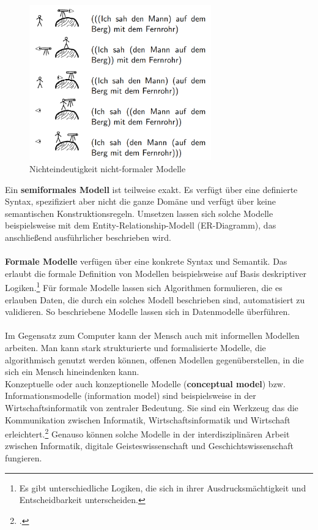 \documentclass[12pt,a4paper]{article}
\begin{document}
\begin{figure}[H]
\centering
	\includegraphics[width=0.7\textwidth]{img/fernrohr.png}  
    \caption[Nichteindeutigkeit nicht-formaler Modelle, KÖNIG Bettina: Vorlesung ''Modellierungsmethoden der Informatik'', \protect\url{ti.inf.uni-due.de/fileadmin/public/teaching/mod/slides/ws201112/einfuehrung.pdf}, 10.06.2019]{Nichteindeutigkeit nicht-formaler Modelle}\label{fig:fernrohr}
\end{figure} 
Ein \textbf{semiformales Modell} ist teilweise exakt. Es verfügt über eine definierte Syntax, spezifiziert aber nicht die ganze Domäne und verfügt über keine semantischen Konstruktionsregeln. Umsetzen lassen sich solche Modelle beispielsweise mit dem Entity-Relationship-Modell (ER-Diagramm), das anschließend ausführlicher beschrieben wird.
\\
\\
\textbf{Formale Modelle} verfügen über eine konkrete Syntax und Semantik. Das erlaubt die formale Definition von Modellen beispielsweise auf Basis deskriptiver Logiken.\footnote{Es gibt unterschiedliche Logiken, die sich in ihrer Ausdrucksmächtigkeit und Entscheidbarkeit unterscheiden.} Für formale Modelle lassen sich Algorithmen formulieren, die es erlauben Daten, die durch ein solches Modell beschrieben sind, automatisiert zu validieren. So beschriebene Modelle lassen sich in Datenmodelle überführen.
\\
\\
Im Gegensatz zum Computer kann der Mensch auch mit informellen Modellen arbeiten. Man kann stark strukturierte und formalisierte Modelle, die algorithmisch genutzt werden können, offenen Modellen gegenüberstellen, in die sich ein Mensch hineindenken kann.
\\
Konzeptuelle oder auch konzeptionelle Modelle (\textbf{conceptual model}) bzw. Informationsmodelle (information model) sind beispielsweise in der Wirtschaftsinformatik von zentraler Bedeutung. Sie sind ein Werkzeug das die Kommunikation zwischen Informatik, Wirtschaftsinformatik und Wirtschaft erleichtert.\footcite[][S.44-47]{kobler2010qualitat} Genauso können solche Modelle in der interdisziplinären Arbeit zwischen Informatik, digitale Geisteswissenschaft und Geschichtswissenschaft fungieren.
\end{document}

